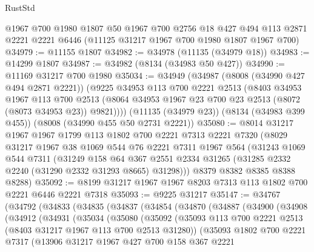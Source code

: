 \begin{lexlean}{RustStd}
\begin{coremodule}
{\begin{coremodule}
{{{{{{{{{{{{{{{{{{{{{{{{{{{{{{{{{{{{{{{{{{{{{{{{{{{{{    @1967
    @700
    @1980
    @1807
    @50
    @1967
    @700
    @2756
    @18
    @427
    @494
    @113
    @2871
    @2221
    @2221
    @6446
    (@11125 @31217 @1967 @700 @1980 @1807 @1967 @700)
@34979 := @11155 @1807
@34982 := @34978 (@11135 (@34979 @18))
@34983 := @14299 @1807
@34987 := @34982 (@8134 (@34983 @50 @427))
@34990 := @11169 @31217 @700 @1980
@35034 := @34949
    (@34987
      (@8008 (@34990 @427 @494 @2871 @2221))
      (@9225
        @34953
        @113
        @700
        @2221
        @2513
        (@8403
          @34953
          @1967
          @113
          @700
          @2513
          (@8064 @34953 @1967 @23 @700 @23 @2513 (@8072 (@8073 @34953 @23)) @9821))))
    (@11135 (@34979 @23))
    (@8134 (@34983 @399 @455))
    (@8008 (@34990 @455 @50 @2731 @2221))
@35080 := @8014
    @31217
    @1967
    @1967
    @1799
    @113
    @1802
    @700
    @2221
    @7313
    @2221
    @7320
    (@8029
      @31217
      @1967
      @38
      @1069
      @544
      @76
      @2221
      @7311
      @1967
      @564
      (@31243
        @1069
        @544
        @7311
        (@31249
          @158
          @64
          @367
          @2551
          @2334
          @31265
          (@31285 @2332 @2240 (@31290 @2332 @31293 @8665) @31298)))
      @8379
      @8382
      @8385
      @8388
      @8288)
@35092 := @8199 @31217 @1967 @1967 @8203 @7313 @113 @1802 @700 @2221 @6446 @2221 @7318
@35093 := @9225 @31217
@35147 := @34767
    (@34792
      (@34833
        (@34835
          (@34837
            (@34854
              (@34870
                (@34887
                  (@34900
                    (@34908
                      (@34912
                        (@34931
                          (@35034
                            (@35080
                              (@35092
                                (@35093
                                  @113
                                  @700
                                  @2221
                                  @2513
                                  (@8403 @31217 @1967 @113 @700 @2513 @31280))
                                (@35093
                                  @1802
                                  @700
                                  @2221
                                  @7317
                                  (@13906
                                    @31217
                                    @1967
                                    @427
                                    @700
                                    @158
                                    @367
                                    @2221
}}}}}}}}}}}}}}}}}}}}}}}}}}}}}}}}}}}}}}}}}}}}}}}}}}}}}
\end{coremodule}}
\end{coremodule}
\end{lexlean}
